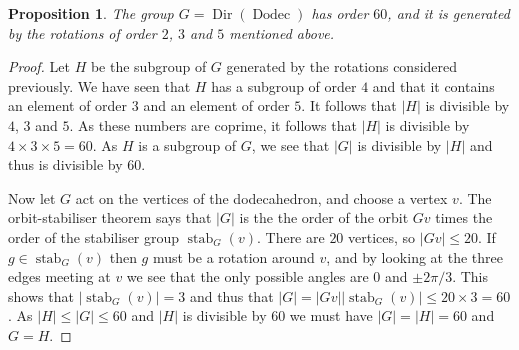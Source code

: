 \documentclass{amsart}
\DeclareMathOperator{\Dodec}    {Dodec}
\DeclareMathOperator{\Dir}      {Dir}
\DeclareMathOperator{\stab}     {stab}
\renewcommand{\:}{\colon}
\newtheorem{proposition}[theorem]{Proposition}
\theoremstyle{definition}
\begin{document}
\begin{proposition}\label{prop-sixty}
 The group $G=\Dir(\Dodec)$ has order $60$, and it is generated by the
 rotations of order $2$, $3$ and $5$ mentioned above.
\end{proposition}
\begin{proof}
 Let $H$ be the subgroup of $G$ generated by the rotations considered
 previously.  We have seen that $H$ has a subgroup of order $4$ and
 that it contains an element of order $3$ and an element of order $5$.
 It follows that $|H|$ is divisible by $4$, $3$ and $5$.  As these
 numbers are coprime, it follows that $|H|$ is divisible by
 $4\times 3\times 5=60$.  As $H$ is a subgroup of $G$, we see that
 $|G|$ is divisible by $|H|$ and thus is divisible by $60$.

 Now let $G$ act on the vertices of the dodecahedron, and choose a
 vertex $v$.  The orbit-stabiliser theorem says that $|G|$ is the
 the order of the orbit $Gv$ times the order of the stabiliser group
 $\stab_G(v)$.  There are $20$ vertices, so $|Gv|\leq 20$.  If
 $g\in\stab_G(v)$ then $g$ must be a rotation around $v$, and by
 looking at the three edges meeting at $v$ we see that the only
 possible angles are $0$ and $\pm 2\pi/3$.  This shows that
 $|\stab_G(v)|=3$ and thus that
 $|G|=|Gv||\stab_G(v)|\leq 20\times 3=60$.  As $|H|\leq |G|\leq 60$
 and $|H|$ is divisible by $60$ we must have $|G|=|H|=60$ and $G=H$.
\end{proof}
\end{document}
